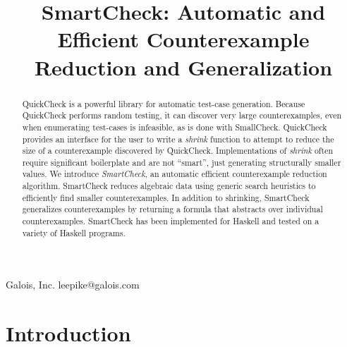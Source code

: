 \documentclass[10pt]{sigplanconf}
\begin{document}


\title{SmartCheck: Automatic and Efficient Counterexample Reduction and Generalization}

           {Galois, Inc.}
           {leepike@galois.com}
\maketitle

\begin{abstract}
QuickCheck is a powerful library for automatic test-case generation.  Because
QuickCheck performs random testing, it can discover very large counterexamples,
even when enumerating test-cases is infeasible, as is done with SmallCheck.
QuickCheck provides an interface for the user to write a \emph{shrink} function
to attempt to reduce the size of a counterexample discovered by QuickCheck.
Implementations of \emph{shrink} often require significant boilerplate and are
not ``smart'', just generating structurally smaller values.  We introduce
\emph{SmartCheck}, an automatic efficient counterexample reduction algorithm.
SmartCheck reduces algebraic data using generic search heuristics to efficiently
find smaller counterexamples.  In addition to shrinking, SmartCheck generalizes
counterexamples by returning a formula that abstracts over individual
counterexamples.  SmartCheck has been implemented for Haskell and tested on a
variety of Haskell programs.
\end{abstract}





\section{Introduction}\label{sec:intro}
\end{document}
